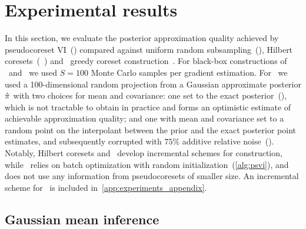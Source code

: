 \section{Experimental results}
\label{sec:experiments}
In this section, we evaluate the posterior approximation quality achieved by
pseudocoreset VI~(\psvi) compared against uniform random subsampling~(\uniform), Hilbert
coresets~(\giga~\citep{campbell18}) and \sparsevi~greedy coreset
construction~\citep{campbell19neurips}.  For black-box constructions of \sparsevi~and \psvi~we used $S =
100$ Monte Carlo samples per gradient estimation. For \giga~we used a
100-dimensional random projection from a Gaussian approximate posterior $\hat{\pi}$
with  two choices for mean and covariance: one set to the exact
posterior~(\optimal), which is not tractable to obtain in practice and forms an
optimistic estimate of achievable approximation quality; and one with mean and
covariance set to a random point on the interpolant between the prior and the
exact posterior point estimates, and subsequently corrupted with $75\%$
additive relative noise~(\realistic). Notably, Hilbert coresets and
\sparsevi~develop incremental schemes for construction, while \psvi~relies on
batch optimization with random initialization~(\cref{alg:psvi}), and does not
use any information from pseudocoresets of smaller size. An incremental scheme
for \sparsevi~is included in~\cref{app:experiments_appendix}. %

\subsection{Gaussian mean inference}
\label{section:gaussian_experiment}

